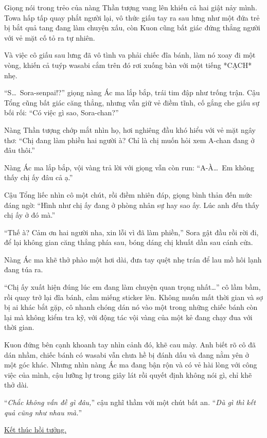 \documentclass[../main.tex]{subfiles}
\begin{document}
Giọng nói trong trẻo của nàng Thần tượng vang lên khiến cả hai giật nảy mình. Towa hấp tấp quay phắt người lại, vô thức giấu tay ra sau lưng như một đứa trẻ bị bắt quả tang đang làm chuyện xấu, còn Kuon cũng bất giác đứng thẳng người với vẻ mặt cố tỏ ra tự nhiên.

Và việc cô giấu sau lưng đã vô tình va phải chiếc đĩa bánh, làm nó xoay đi một vòng, khiến cả tuýp wasabi cắm trên đó rơi xuống bàn với một tiếng *CẠCH* nhẹ.


``S\dots\ Sora-senpai!?'' giọng nàng Ác ma lắp bắp, trái tim đập như trống trận. Cậu Tổng cũng bất giác căng thẳng, nhưng vẫn giữ vẻ điềm tĩnh, cố gắng che giấu sự bối rối: ``Có việc gì sao, Sora-chan?''

Nàng Thần tượng chớp mắt nhìn họ, hơi nghiêng đầu khó hiểu với vẻ mặt ngây thơ: ``Chị đang làm phiền hai người à? Chỉ là chị muốn hỏi xem A-chan đang ở đâu thôi.''

Nàng Ác ma lắp bắp, vội vàng trả lời với giọng vẫn còn run: ``A-À\dots\ Em không thấy chị ấy đâu cả ạ.''

Cậu Tổng liếc nhìn cô một chút, rồi điềm nhiên đáp, giọng bình thản đến mức đáng ngờ: ``Hình như chị ấy đang ở phòng nhân sự hay sao ấy. Lúc anh đến thấy chị ấy ở đó mà.''

``Thế à? Cảm ơn hai người nha, xin lỗi vì đã làm phiền,'' Sora gật đầu rồi rời đi, để lại không gian căng thẳng phía sau, bóng dáng chị khuất dần sau cánh cửa.

Nàng Ác ma khẽ thở phào một hơi dài, đưa tay quệt nhẹ trán để lau mồ hôi lạnh đang túa ra.

``Chị ấy xuất hiện đúng lúc em đang làm chuyện quan trọng nhất\dots'' cô lầm bầm, rồi quay trở lại đĩa bánh, cầm miếng sticker lên. Không muốn mất thời gian và sợ bị ai khác bắt gặp, cô nhanh chóng dán nó vào một trong những chiếc bánh còn lại mà không kiểm tra kỹ, với động tác vội vàng của một kẻ đang chạy đua với thời gian.

Kuon đứng bên cạnh khoanh tay nhìn cảnh đó, khẽ cau mày. Anh biết rõ cô đã dán nhầm, chiếc bánh có wasabi vẫn chưa hề bị đánh dấu và đang nằm yên ở một góc khác. Nhưng nhìn nàng Ác ma đang bận rộn và có vẻ hài lòng với công việc của mình, cậu lưỡng lự trong giây lát rồi quyết định không nói gì, chỉ khẽ thở dài.

``\textit{Chắc không vấn đề gì đâu,}'' cậu nghĩ thầm với một chút bất an. ``\textit{Dù gì thì kết quả cũng như nhau mà.}''

\begin{center}
  \uline{Kết thúc hồi tưởng.}
\end{center}
\end{document}
